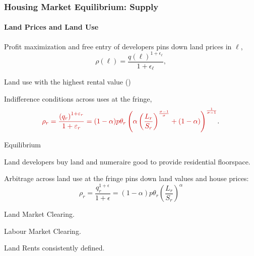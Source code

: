 \documentclass[aspectratio=169]{beamer}
\begin{document}
\begin{v75mins}
\begin{frame}
\frametitle{Housing Market Equilibrium: Supply}
\framesubtitle{Land Prices and Land Use}
\bi
\item Profit maximization and free entry of developers pins down land prices in $\ell$,
\begin{equation*}
\rho(\ell)=\frac{q(\ell)^{1+\epsilon_{\ell}}}{ 1+\epsilon_{\ell}},
\end{equation*}
\item Land use with the highest rental value ()
\item Indifference conditions across uses at the fringe,
\begin{equation*}
 \re{\rho_r=\frac{\left( q_r \right)^{1+\varepsilon_r}}{1+\varepsilon_r} = (1-\alpha)p\theta_r\left(\alpha \left(\frac{L_r}{S_r}\right)^{\frac{\sigma-1}{\sigma}} +(1-\alpha) \right)^{\frac{1}{\sigma-1}}}.
\end{equation*}
\ei
\end{frame}
\end{v75mins}


\begin{frame}{Equilibrium}

	\begin{midi}
		\item Land developers buy land and numeraire good to provide residential floorspace.
		\item Arbitrage across land use at the fringe pins down land values and house prices:
		\begin{equation*}
			\rho_r = \frac{q_r^{1+\epsilon}}{1+\epsilon} = (1-\alpha)p \theta_r \left(\frac{L_r}{S_r}\right)^\alpha
		\end{equation*}
		\item Land Market Clearing.
		\item Labour Market Clearing.
		\item Land Rents consistently defined.
	\end{midi}

\end{frame}
\end{document}
